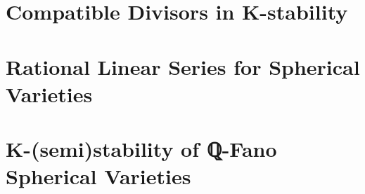 \documentclass[11pt, oneside]{amsart}
\begin{document}
\section{Compatible Divisors in K-stability}\label{sec:comp}


\section{Rational Linear Series for Spherical Varieties}\label{sec:Qls}


\section{K-(semi)stability of ℚ-Fano Spherical Varieties}\label{sec:KstSph}


\printbibliography
\end{document}
